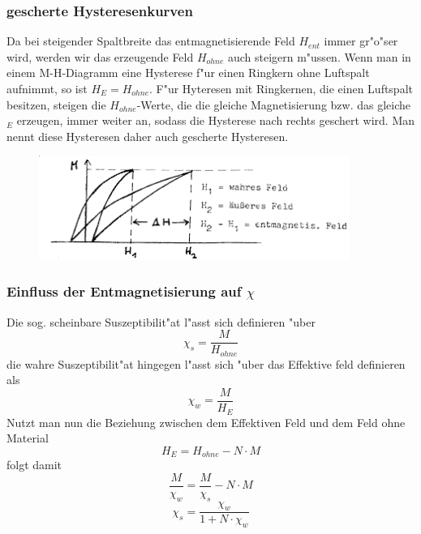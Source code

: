         \subsubsection*{gescherte Hysteresenkurven}
            Da bei steigender Spaltbreite das entmagnetisierende Feld $H_{ent}$ immer gr"o"ser wird, werden wir das erzeugende Feld $H_{ohne}$
            auch steigern m"ussen. Wenn man in einem M-H-Diagramm eine Hysterese f"ur einen Ringkern
            ohne Luftspalt aufnimmt, so ist $H_{E}=H_{ohne}$. F"ur Hyteresen mit Ringkernen,
            die einen Luftspalt besitzen, steigen die $H_{ohne}$-Werte, die die gleiche Magnetisierung
            bzw. das gleiche $_{E}$ erzeugen, immer weiter an, sodass die Hysterese nach rechts
            geschert wird. Man nennt diese Hysteresen daher auch gescherte Hysteresen.
            \begin{figure}
                \centering
                \includegraphics[width=0.9\textwidth]{Images/geschert.png}
            \end{figure}

        \subsubsection*{Einfluss der Entmagnetisierung auf $\chi$}
            Die sog. scheinbare Suszeptibilit"at l"asst sich definieren "uber
            \begin{equation}
                \chi_s = \frac{M}{H_{ohne}}
            \end{equation}
            die wahre Suszeptibilit"at hingegen l"asst sich "uber das Effektive feld definieren als
            \begin{equation}
                \chi_w = \frac{M}{H_{E}}
            \end{equation}
            Nutzt man nun die Beziehung zwischen dem Effektiven Feld und dem Feld ohne Material
            \begin{equation}
                H_E = H_{ohne} - N\cdot M
            \end{equation}
            folgt damit
            \begin{equation}
                \frac{M}{\chi_w} = \frac{M}{\chi_s} - N \cdot M
            \end{equation}
            \begin{equation}
                \chi_s = \frac{\chi_w}{1+N\cdot \chi_w}
            \end{equation}

